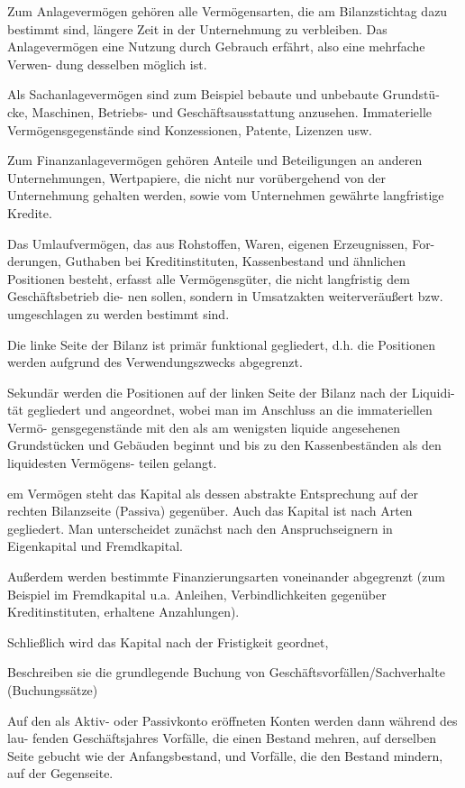 Zum Anlagevermögen gehören alle Vermögensarten, die am Bilanzstichtag dazu
bestimmt sind, längere Zeit in der Unternehmung zu verbleiben.
Das Anlagevermögen eine Nutzung durch Gebrauch erfährt, also eine mehrfache Verwen-
dung desselben möglich ist.

Als Sachanlagevermögen sind zum Beispiel bebaute und unbebaute Grundstü-
cke, Maschinen, Betriebs- und Geschäftsausstattung anzusehen.
Immaterielle Vermögensgegenstände sind Konzessionen, Patente, Lizenzen usw.

Zum Finanzanlagevermögen gehören Anteile und Beteiligungen an anderen
Unternehmungen, Wertpapiere, die nicht nur vorübergehend von der Unternehmung
gehalten werden, sowie vom Unternehmen gewährte langfristige Kredite.

Das Umlaufvermögen, das aus Rohstoffen, Waren, eigenen Erzeugnissen, For-
derungen, Guthaben bei Kreditinstituten, Kassenbestand und ähnlichen Positionen
besteht, erfasst alle Vermögensgüter, die nicht langfristig dem Geschäftsbetrieb die-
nen sollen, sondern in Umsatzakten weiterveräußert bzw. umgeschlagen zu werden
bestimmt sind.

Die linke Seite der Bilanz ist primär funktional gegliedert, d.h. die Positionen
werden aufgrund des Verwendungszwecks abgegrenzt.

Sekundär werden die Positionen auf der linken Seite der Bilanz nach der Liquidi-
tät gegliedert und angeordnet, wobei man im Anschluss an die immateriellen Vermö-
gensgegenstände mit den als am wenigsten liquide angesehenen Grundstücken und
Gebäuden beginnt und bis zu den Kassenbeständen als den liquidesten Vermögens-
teilen gelangt.

em Vermögen steht das Kapital als dessen abstrakte Entsprechung auf der rechten
Bilanzseite (Passiva) gegenüber. 
Auch das Kapital ist nach Arten gegliedert. 
Man unterscheidet zunächst nach den Anspruchseignern in Eigenkapital und Fremdkapital.

Außerdem werden bestimmte Finanzierungsarten voneinander abgegrenzt (zum
Beispiel im Fremdkapital u.a. Anleihen, Verbindlichkeiten gegenüber Kreditinstituten,
erhaltene Anzahlungen). 

Schließlich wird das Kapital nach der Fristigkeit geordnet,


Beschreiben sie die grundlegende Buchung von Geschäftsvorfällen/Sachverhalte (Buchungssätze)

Auf den als Aktiv- oder Passivkonto eröffneten Konten werden dann während des lau-
fenden Geschäftsjahres Vorfälle, die einen Bestand mehren, auf derselben Seite
gebucht wie der Anfangsbestand, und Vorfälle, die den Bestand mindern, auf der
Gegenseite.

